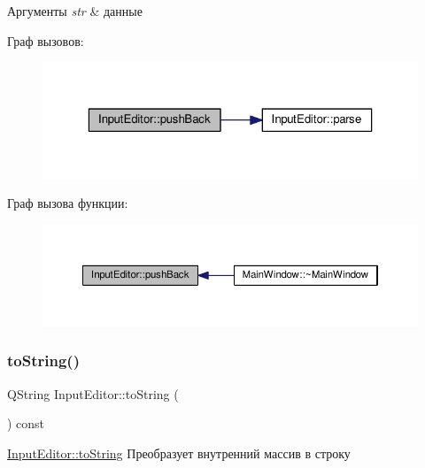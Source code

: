 \begin{DoxyParams}{Аргументы}
{\em str} & данные \\
\hline
\end{DoxyParams}
Граф вызовов\+:\nopagebreak
\begin{figure}[H]
\begin{center}
\leavevmode
\includegraphics[width=323pt]{class_input_editor_a4b357e281c2d9cf669ed4a03c8de5190_cgraph}
\end{center}
\end{figure}
Граф вызова функции\+:\nopagebreak
\begin{figure}[H]
\begin{center}
\leavevmode
\includegraphics[width=350pt]{class_input_editor_a4b357e281c2d9cf669ed4a03c8de5190_icgraph}
\end{center}
\end{figure}
\mbox{\label{class_input_editor_ab65dc1f4a87be3abf8bfff14c1a54532}} 
\subsubsection{\texorpdfstring{to\+String()}{toString()}}
{\footnotesize\ttfamily Q\+String Input\+Editor\+::to\+String (\begin{DoxyParamCaption}{ }\end{DoxyParamCaption}) const}



\hyperlink{class_input_editor_ab65dc1f4a87be3abf8bfff14c1a54532}{Input\+Editor\+::to\+String} Преобразует внутренний массив в строку 

